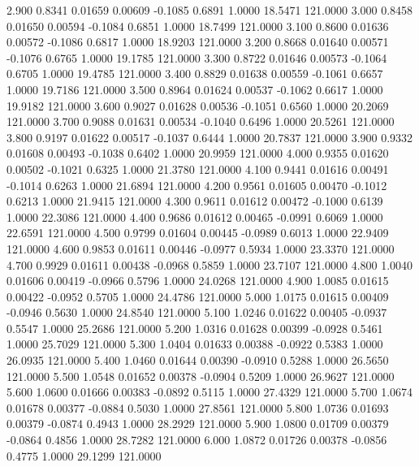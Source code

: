    2.900   0.8341   0.01659   0.00609  -0.1085   0.6891   1.0000  18.5471 121.0000
   3.000   0.8458   0.01650   0.00594  -0.1084   0.6851   1.0000  18.7499 121.0000
   3.100   0.8600   0.01636   0.00572  -0.1086   0.6817   1.0000  18.9203 121.0000
   3.200   0.8668   0.01640   0.00571  -0.1076   0.6765   1.0000  19.1785 121.0000
   3.300   0.8722   0.01646   0.00573  -0.1064   0.6705   1.0000  19.4785 121.0000
   3.400   0.8829   0.01638   0.00559  -0.1061   0.6657   1.0000  19.7186 121.0000
   3.500   0.8964   0.01624   0.00537  -0.1062   0.6617   1.0000  19.9182 121.0000
   3.600   0.9027   0.01628   0.00536  -0.1051   0.6560   1.0000  20.2069 121.0000
   3.700   0.9088   0.01631   0.00534  -0.1040   0.6496   1.0000  20.5261 121.0000
   3.800   0.9197   0.01622   0.00517  -0.1037   0.6444   1.0000  20.7837 121.0000
   3.900   0.9332   0.01608   0.00493  -0.1038   0.6402   1.0000  20.9959 121.0000
   4.000   0.9355   0.01620   0.00502  -0.1021   0.6325   1.0000  21.3780 121.0000
   4.100   0.9441   0.01616   0.00491  -0.1014   0.6263   1.0000  21.6894 121.0000
   4.200   0.9561   0.01605   0.00470  -0.1012   0.6213   1.0000  21.9415 121.0000
   4.300   0.9611   0.01612   0.00472  -0.1000   0.6139   1.0000  22.3086 121.0000
   4.400   0.9686   0.01612   0.00465  -0.0991   0.6069   1.0000  22.6591 121.0000
   4.500   0.9799   0.01604   0.00445  -0.0989   0.6013   1.0000  22.9409 121.0000
   4.600   0.9853   0.01611   0.00446  -0.0977   0.5934   1.0000  23.3370 121.0000
   4.700   0.9929   0.01611   0.00438  -0.0968   0.5859   1.0000  23.7107 121.0000
   4.800   1.0040   0.01606   0.00419  -0.0966   0.5796   1.0000  24.0268 121.0000
   4.900   1.0085   0.01615   0.00422  -0.0952   0.5705   1.0000  24.4786 121.0000
   5.000   1.0175   0.01615   0.00409  -0.0946   0.5630   1.0000  24.8540 121.0000
   5.100   1.0246   0.01622   0.00405  -0.0937   0.5547   1.0000  25.2686 121.0000
   5.200   1.0316   0.01628   0.00399  -0.0928   0.5461   1.0000  25.7029 121.0000
   5.300   1.0404   0.01633   0.00388  -0.0922   0.5383   1.0000  26.0935 121.0000
   5.400   1.0460   0.01644   0.00390  -0.0910   0.5288   1.0000  26.5650 121.0000
   5.500   1.0548   0.01652   0.00378  -0.0904   0.5209   1.0000  26.9627 121.0000
   5.600   1.0600   0.01666   0.00383  -0.0892   0.5115   1.0000  27.4329 121.0000
   5.700   1.0674   0.01678   0.00377  -0.0884   0.5030   1.0000  27.8561 121.0000
   5.800   1.0736   0.01693   0.00379  -0.0874   0.4943   1.0000  28.2929 121.0000
   5.900   1.0800   0.01709   0.00379  -0.0864   0.4856   1.0000  28.7282 121.0000
   6.000   1.0872   0.01726   0.00378  -0.0856   0.4775   1.0000  29.1299 121.0000
